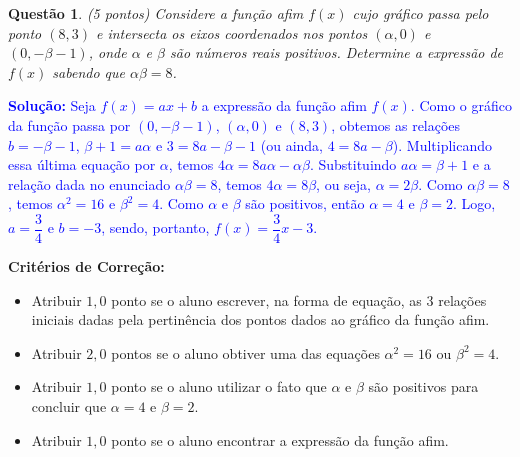 \documentclass[oneside,a4paper,12pt]{article}
\theoremstyle{Colorido}
\theoremstyle{solu}
\theoremstyle{dotlessP}
\newcommand{\solucao}[1]{\textcolor{blue}{\textbf{Solução:} #1}}
\newtheorem{sol}{Questão}
\begin{document}
\newpage
	\begin{sol}
\textit{(5 pontos)} \newline \newline
Considere a função afim $f(x)$ cujo gráfico passa pelo ponto $(8,3)$ e intersecta os eixos coordenados nos pontos $(\alpha,0)$ e $(0,-\beta-1)$, onde $\alpha$ e $\beta$ são números reais positivos. Determine a expressão de $f(x)$ sabendo que $\alpha\beta=8$.
\end{sol}
\solucao{Seja $f(x)=ax+b$ a expressão da função afim $f(x)$. Como o gráfico da função passa por $(0,-\beta-1)$, $(\alpha,0)$ e $(8,3)$, obtemos as relações $b=-\beta-1$, $\beta+1=a\alpha$ e $3=8a-\beta-1$ (ou ainda, $4=8a-\beta$). Multiplicando essa última equação por $\alpha$, temos $4\alpha=8a\alpha-\alpha\beta$. Substituindo $a\alpha=\beta+1$ e a relação dada no enunciado $\alpha\beta=8$, temos $4\alpha=8\beta$, ou seja, $\alpha=2\beta$. Como $\alpha\beta=8$, temos $\alpha^2=16$ e $\beta^2=4$. Como $\alpha$ e $\beta$ são positivos, então $\alpha=4$ e $\beta=2$. Logo, $a=\dfrac{3}{4}$ e $b=-3$, sendo, portanto, $f(x)=\dfrac{3}{4}x-3$.}
\begin{mdframed}
\textbf{Critérios de Correção:} \\
\begin{itemize}
    \item  Atribuir $1,0$ ponto se o aluno escrever, na forma de equação, as $3$ relações iniciais dadas pela pertinência dos pontos dados ao gráfico da função afim.
    \item   Atribuir $2,0$ pontos se o aluno obtiver uma das equações $\alpha^2=16$ ou $\beta^2=4$.
    \item  Atribuir $1,0$ ponto se o aluno utilizar o fato que $\alpha$ e $\beta$ são positivos para concluir que $\alpha=4$ e $\beta=2$.
    \item Atribuir $1,0$ ponto se o aluno encontrar a expressão da função afim.
\end{itemize}
\end{mdframed}
		
	

		

		
		
		
		
		
	\flushbottom
	\flushright
\end{document}
